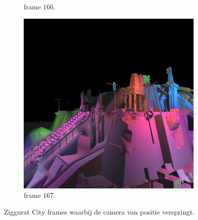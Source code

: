 \begin{figure}[tb]
\begin{subfigure}[b]{0.32\textwidth}
    \caption{frame $166$.}
    \label{fig:fds-test-frames-example:zc:166}
  \end{subfigure}\quad %
  \begin{subfigure}[b]{0.32\textwidth}
    \includegraphics[width=\textwidth]{./img/raw/fds-test-frames-example/zc_167.png}
    \caption{frame $167$.}
    \label{fig:fds-test-frames-example:zc:167}
  \end{subfigure}
  \caption{ Ziggurat City frames waarbij de camera van positie verspringt.}
  \label{fig:fds-test-frames-example:zc}
\end{figure}

